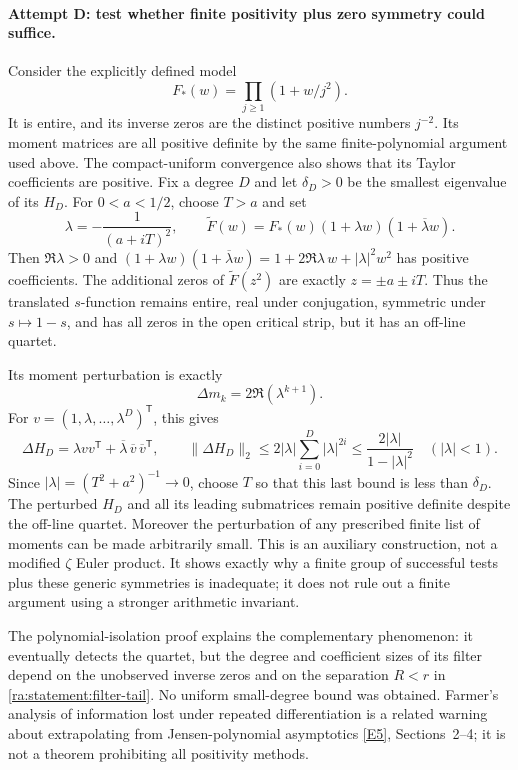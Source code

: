 \documentclass[11pt]{article}
\newcommand{\eref}[2]{\hyperlink{extra:#1:#2}{[E#2]}}
\begin{document}
\paragraph{Attempt D: test whether finite positivity plus zero symmetry could suffice.}
Consider the explicitly defined model
\[
 F_*(w)=\prod_{j\ge1}(1+w/j^2).
\]
It is entire, and its inverse zeros are the distinct positive numbers $j^{-2}$.
Its moment matrices are all positive definite by the same finite-polynomial
argument used above. The compact-uniform convergence also shows that its
Taylor coefficients are positive. Fix a degree $D$ and let $\delta_D>0$
be the smallest eigenvalue of its $H_D$. For $0<a<1/2$, choose $T>a$ and set
\begin{equation}\label{ra:statement:perturb}
 \lambda=-\frac1{(a+iT)^2},\qquad
 \widetilde F(w)=F_*(w)(1+\lambda w)(1+\overline\lambda w).
\end{equation}
Then $\Re\lambda>0$ and
$(1+\lambda w)(1+\overline\lambda w)
=1+2\Re\lambda\,w+|\lambda|^2w^2$ has positive coefficients.
The additional zeros of $\widetilde F(z^2)$ are exactly
$z=\pm a\pm iT$. Thus the translated $s$-function remains entire, real under
conjugation, symmetric under $s\mapsto1-s$, and has all zeros in the open
critical strip, but it has an off-line quartet.

Its moment perturbation is exactly
\[
 \Delta m_k=2\Re(\lambda^{k+1}).
\]
For $v=(1,\lambda,\ldots,\lambda^D)^{\mathsf T}$, this gives
\[
 \Delta H_D=\lambda vv^{\mathsf T}
           +\overline\lambda\,\overline v\,\overline v^{\mathsf T},
 \qquad
 \|\Delta H_D\|_2\le
      2|\lambda|\sum_{i=0}^D|\lambda|^{2i}
      \le\frac{2|\lambda|}{1-|\lambda|^2}\quad(|\lambda|<1).
\]
Since $|\lambda|=(T^2+a^2)^{-1}\to0$, choose $T$ so that this last bound
is less than $\delta_D$. The perturbed $H_D$ and all its leading submatrices
remain positive definite despite the off-line quartet. Moreover the
perturbation of any prescribed finite list of moments can be made arbitrarily
small. This is an auxiliary construction, not a modified $\zeta$ Euler product.
It shows exactly why a finite group of successful tests plus these generic
symmetries is inadequate; it does not rule out a finite argument using a
stronger arithmetic invariant.

The polynomial-isolation proof explains the complementary phenomenon:
it eventually detects the quartet, but the degree and coefficient sizes of
its filter depend on the unobserved inverse zeros and on the separation
$R<r$ in \eqref{ra:statement:filter-tail}. No uniform small-degree bound was obtained.
Farmer's analysis of information lost under repeated differentiation is a
related warning about extrapolating from Jensen-polynomial asymptotics
\eref{statement}{5}, Sections~2--4; it is not a theorem prohibiting all positivity
methods.
\end{document}
